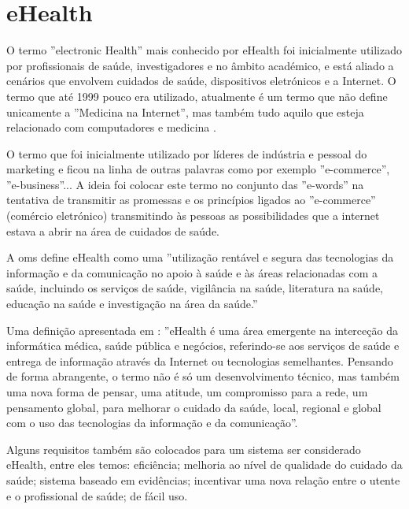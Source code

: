 \documentclass[11pt,twoside,a4paper]{report}
\begin{document}
\section{eHealth}
O termo ''electronic Health'' mais conhecido por eHealth foi inicialmente utilizado por profissionais de sa\'ude, investigadores e no \^ambito acad\'emico, e est\'a aliado a cen\'arios que envolvem cuidados de sa\'ude, dispositivos eletr\'onicos e a Internet. O termo que at\'e 1999 pouco era utilizado, atualmente \'e um termo que n\~ao define unicamente a ''Medicina na Internet'', mas tamb\'em tudo aquilo que esteja relacionado com computadores e medicina \cite{ehealth}.
\par
O termo que foi inicialmente utilizado por l\'ideres de ind\'ustria e pessoal do marketing e ficou na linha de outras palavras como por exemplo ''e-commerce'', ''e-business''... A ideia foi colocar este termo no conjunto das ''e-words'' na tentativa de transmitir as promessas e os princ\'ipios ligados ao ''e-commerce'' (com\'ercio eletr\'onico) transmitindo \`as pessoas as possibilidades que a internet estava a abrir na \'area de cuidados de sa\'ude. 
\par A \gls{oms} define eHealth \cite{ehealth_oms} como uma ''utiliza\c c\~ao rent\'avel e segura das tecnologias da informa\c c\~ao e da comunica\c c\~ao no apoio \`a sa\'ude e \`as \'areas relacionadas com a sa\'ude, incluindo os servi\c cos de sa\'ude, vigil\^ancia na sa\'ude, literatura na sa\'ude, educa\c c\~ao na sa\'ude e investiga\c c\~ao na \'area da sa\'ude.''
\par
Uma defini\c c\~ao apresentada em \cite{ehealth}: ''eHealth \'e uma \'area emergente na interce\c c\~ao da inform\'atica m\'edica, sa\'ude p\'ublica e neg\'ocios, referindo-se aos servi\c cos de sa\'ude e entrega de informa\c c\~ao atrav\'es da Internet ou tecnologias semelhantes. Pensando de forma abrangente, o termo n\~ao \'e s\'o um desenvolvimento t\'ecnico, mas tamb\'em uma nova forma de pensar, uma atitude, um compromisso para a rede, um pensamento global, para melhorar o cuidado da sa\'ude, local, regional e global com o uso das tecnologias da informa\c c\~ao e da comunica\c c\~ao''.
\par
Alguns requisitos tamb\'em s\~ao colocados \cite{ehealth} para um sistema ser considerado eHealth, entre eles temos: efici\^encia; melhoria ao n\'ivel de qualidade do cuidado da sa\'ude; sistema baseado em evid\^encias; incentivar uma nova rela\c c\~ao entre o utente e o profissional de sa\'ude; de f\'acil uso.
\end{document}
